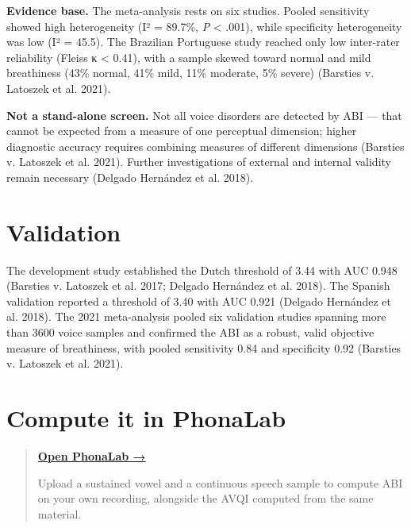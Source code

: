 \documentclass[
  english,
  letterpaper,
]{scrbook}
\begin{document}
\textbf{Evidence base.} The meta-analysis rests on six studies. Pooled
sensitivity showed high heterogeneity (I² = 89.7\%, \emph{P} \textless{}
.001), while specificity heterogeneity was low (I² = 45.5). The
Brazilian Portuguese study reached only low inter-rater reliability
(Fleiss κ \textless{} 0.41), with a sample skewed toward normal and mild
breathiness (43\% normal, 41\% mild, 11\% moderate, 5\% severe)
(Barsties v. Latoszek et al. 2021).

\textbf{Not a stand-alone screen.} Not all voice disorders are detected
by ABI --- that cannot be expected from a measure of one perceptual
dimension; higher diagnostic accuracy requires combining measures of
different dimensions (Barsties v. Latoszek et al. 2021). Further
investigations of external and internal validity remain necessary
(Delgado Hernández et al. 2018).

\section{Validation}\label{validation-2}

The development study established the Dutch threshold of 3.44 with AUC
0.948 (Barsties v. Latoszek et al. 2017; Delgado Hernández et al. 2018).
The Spanish validation reported a threshold of 3.40 with AUC 0.921
(Delgado Hernández et al. 2018). The 2021 meta-analysis pooled six
validation studies spanning more than 3600 voice samples and confirmed
the ABI as a robust, valid objective measure of breathiness, with pooled
sensitivity 0.84 and specificity 0.92 (Barsties v. Latoszek et al.
2021).

\section{Compute it in PhonaLab}\label{compute-it-in-phonalab-2}

\begin{quote}
\textbf{\href{https://phonalab.com}{Open PhonaLab →}}

Upload a sustained vowel and a continuous speech sample to compute ABI
on your own recording, alongside the AVQI computed from the same
material.
\end{quote}
\end{document}
